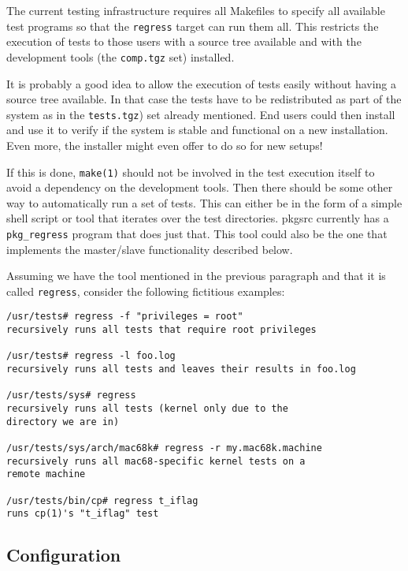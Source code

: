\documentclass[a4paper,10pt]{article}
\begin{document}
The current testing infrastructure requires all Makefiles to specify all
available test programs so that the \verb*|regress| target can run them
all.  This restricts the execution of tests to those users with a source
tree available and with the development tools (the \verb*|comp.tgz| set)
installed.

It is probably a good idea to allow the execution of tests easily without
having a source tree available.  In that case the tests have to be
redistributed as part of the system as in the \verb*|tests.tgz|) set
already mentioned.  End users could then install and use it to verify if
the system is stable and functional on a new installation.  Even more, the
installer might even offer to do so for new setups!

If this is done, \verb*|make(1)| should not be involved in the test
execution itself to avoid a dependency on the development tools.  Then
there should be some other way to automatically run a set of tests.  This
can either be in the form of a simple shell script or tool that iterates
over the test directories.  pkgsrc currently has a \verb*|pkg_regress|
program that does just that. This tool could also be the one that
implements the master/slave functionality described below.

Assuming we have the tool mentioned in the previous paragraph and that
it is called \verb*|regress|, consider the following fictitious examples:

\begin{verbatim}
/usr/tests# regress -f "privileges = root"
recursively runs all tests that require root privileges

/usr/tests# regress -l foo.log
recursively runs all tests and leaves their results in foo.log

/usr/tests/sys# regress
recursively runs all tests (kernel only due to the
directory we are in)

/usr/tests/sys/arch/mac68k# regress -r my.mac68k.machine
recursively runs all mac68-specific kernel tests on a
remote machine

/usr/tests/bin/cp# regress t_iflag
runs cp(1)'s "t_iflag" test
\end{verbatim}


\subsection{Configuration}
\end{document}

